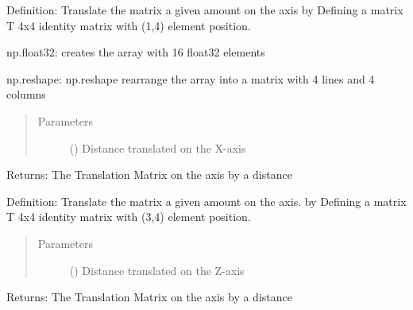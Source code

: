 \documentclass[letterpaper,10pt,english]{sphinxmanual}
\begin{document}
\begin{fulllineitems}
\label{\detokenize{rst/Example_6:Example_6.T_trans_x}}
Definition: Translate the matrix a given amount  on the  axis by Defining a matrix T 4x4 identity
matrix with  (1,4) element position.

np.float32: creates the array with 16 float32 elements

np.reshape: np.reshape rearrange the array into a matrix with 4 lines and 4 columns
\begin{quote}\begin{description}
\item[{Parameters}] \leavevmode
{} () \textendash{} Distance translated on the X-axis

\end{description}\end{quote}

Returns: The Translation Matrix on the  axis by a distance 

\end{fulllineitems}


\begin{fulllineitems}
\label{\detokenize{rst/Example_6:Example_6.T_trans_z}}
Definition: Translate the matrix a given amount  on the  axis. by Defining a matrix T 4x4 identity
matrix with  (3,4) element position.
\begin{quote}\begin{description}
\item[{Parameters}] \leavevmode
{} () \textendash{} Distance translated on the Z-axis

\end{description}\end{quote}

Returns: The Translation Matrix on the  axis by a distance 

\end{fulllineitems}
\end{document}
